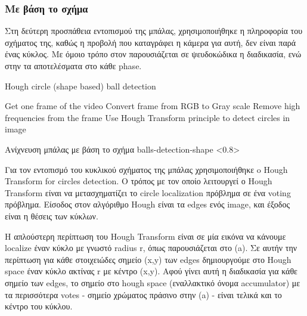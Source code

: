 \subsubsection{Με βάση το σχήμα}

Στη δεύτερη προσπάθεια εντοπισμού της μπάλας, χρησιμοποιήθηκε η πληροφορία του σχήματος της, καθώς η προβολή που καταγράφει η κάμερα για αυτή, δεν είναι παρά ένας κύκλος. Με όμοιο τρόπο στον  παρουσιάζεται σε ψευδοκώδικα η διαδικασία, ενώ στην  τα αποτελέσματα στο κάθε phase.

\begin{algorithm}[H]
	\caption[Hough circle (shape based) ball detection]{Hough circle (shape based) ball detection}\label{alg:hough-detect}
	\begin{algorithmic}[1]
            \State Get one frame of the video
            \State Convert frame from RGB to Gray scale
            \State Remove high frequencies from the frame
            \State Use Hough Transform principle to detect circles in image 
	\end{algorithmic}
\end{algorithm}

%
{Ανίχνευση μπάλας με βάση το σχήμα}%
{balls-detection-shape}%
<0.8>

Για τον εντοπισμό του κυκλικού σχήματος της μπάλας χρησιμοποιήθηκε o Hough Transform for circles detection.
Ο τρόπος με τον οποίο λειτουργεί ο Hough Transform είναι να μετασχηματίζει το circle localization πρόβλημα σε ένα voting πρόβλημα.
Είσοδος στον αλγόριθμο Hough είναι τα edges ενός image, και έξοδος είναι η θέσεις των κύκλων.

Η απλούστερη περίπτωση του Hough Transform είναι σε μία εικόνα να κάνουμε localize έναν κύκλο με γνωστό radius r, όπως παρουσιάζεται στο  (a). Σε αυτήν την περίπτωση για κάθε στοιχειώδες σημείο (x,y) των edges δημιουργούμε στο Hough space έναν κύκλο ακτίνας r με κέντρο (x,y). Αφού γίνει αυτή η διαδικασία για κάθε σημείο των edges, το σημείο στο hough space (εναλλακτικό όνομα accumulator) με τα περισσότερα votes - σημείο χρώματος πράσινο στην  (a) - είναι τελικά και το κέντρο του κύκλου.

